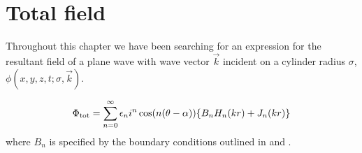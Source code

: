 \section{Total field}
Throughout this chapter we have been searching for an expression for the resultant field of a plane wave with wave vector $\vec{k}$ incident on a cylinder radius $\sigma$, $\phi(x,y,z,t;\sigma, \vec{k})$.\par
%
    \begin{propn}
        \begin{equation*}
            \Phi_{\text{tot}} =
            \sum^\infty_{n=0} \epsilon_n i^n \cos(n(\theta-\alpha))
             \{B_n H_n(kr) + J_n(kr)\}
        \end{equation*}
      where $B_n$ is specified by the boundary conditions outlined in  and .
    \end{propn}
